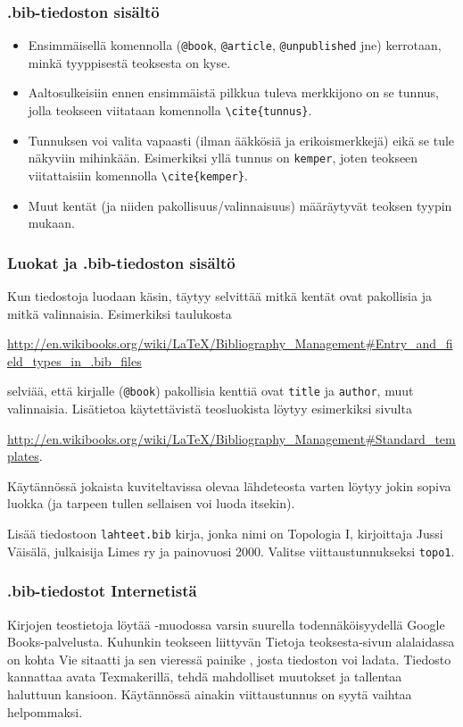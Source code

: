 \begin{frame}[fragile]
    \frametitle{.bib-tiedoston sisältö}
    \begin{itemize}
        \item Ensimmäisellä komennolla (\verb-@book-, \verb-@article-, \verb-@unpublished- jne) kerrotaan, minkä tyyppisestä teoksesta on kyse. 
        \item Aaltosulkeisiin ennen ensimmäistä pilkkua tuleva merkkijono on se tunnus, jolla teokseen viitataan komennolla \verb-\cite{tunnus}-. 
        \item Tunnuksen voi valita vapaasti (ilman ääkkösiä ja erikoismerkkejä) eikä se tule näkyviin mihinkään.  Esimerkiksi yllä tunnus on \verb-kemper-, joten teokseen viitattaisiin komennolla \verb-\cite{kemper}-.
        \item Muut kentät (ja niiden pakollisuus/valinnaisuus) määräytyvät teoksen tyypin mukaan.
    \end{itemize}
\end{frame}
\begin{frame}[fragile]
    \frametitle{Luokat ja .bib-tiedoston sisältö}
    Kun tiedostoja luodaan käsin, täytyy selvittää mitkä kentät ovat pakollisia ja mitkä valinnaisia. 
    \vaihto
    Esimerkiksi taulukosta 
    \begin{scriptsize}
        \url{http://en.wikibooks.org/wiki/LaTeX/Bibliography_Management#Entry_and_field_types_in_.bib_files}
    \end{scriptsize}
    selviää, että kirjalle (\verb-@book-) pakollisia kenttiä ovat \verb-title- ja \verb-author-, muut valinnaisia.
    \vaihto
    Lisätietoa käytettävistä teosluokista löytyy esimerkiksi sivulta
    \begin{scriptsize}
        \url{http://en.wikibooks.org/wiki/LaTeX/Bibliography_Management#Standard_templates}.
    \end{scriptsize}
    \vaihto
    Käytännössä jokaista kuviteltavissa olevaa lähdeteosta varten löytyy jokin sopiva luokka (ja tarpeen tullen sellaisen voi luoda itsekin).
\end{frame}
\begin{frame}[fragile]
    \begin{harj}
        Lisää tiedostoon \verb-lahteet.bib- kirja, jonka nimi on Topologia I, kirjoittaja Jussi Väisälä, julkaisija Limes ry ja painovuosi 2000. Valitse viittaustunnukseksi \verb-topo1-.
    \end{harj}
\end{frame}
\begin{frame}[fragile]
    \frametitle{.bib-tiedostot Internetistä}
    Kirjojen teostietoja löytää \BibTeX -muodossa varsin suurella todennäköisyydellä Google Books-palvelusta. 
    \vaihto
    Kuhunkin teokseen liittyvän Tietoja teoksesta-sivun alalaidassa on kohta Vie sitaatti ja sen vieressä painike \BibTeX, josta tiedoston voi ladata.
    \vaihto
    Tiedosto kannattaa avata Texmakerillä, tehdä mahdolliset muutokset ja tallentaa haluttuun kansioon. 
    \vaihto
    Käytännössä ainakin viittaustunnus on syytä vaihtaa helpommaksi.
\end{frame}
